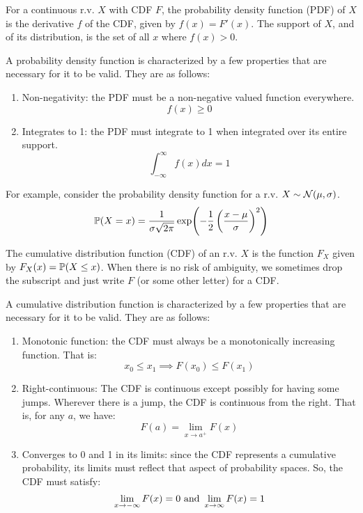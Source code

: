 \begin{definition}
For a continuous r.v. $X$ with CDF $F$, the probability density function (PDF) of $X$ is the derivative $f$ of the CDF, given by $f(x) = F'(x)$. The support of $X$, and of its distribution, is the set of all $x$ where $f(x) > 0$.
\end{definition}

\begin{theorem}
A probability density function is characterized by a few properties that are necessary for it to be valid. They are as follows:
  \begin{enumerate}
    \item Non-negativity: the PDF must be a non-negative valued function everywhere.
      $$ f(x) \geq 0  $$
    \item Integrates to 1: the PDF must integrate to 1 when integrated over its entire support.
    $$ \int_{-\infty}^{\infty} f(x) dx = 1 $$
    \end{enumerate}
\end{theorem}

\begin{example}
For example, consider the probability density function for a r.v. $X \sim \Normal(\mu, \sigma)$.
$$\P(X = x) = \frac{1}{\sigma \sqrt{2 \pi}} \exp (-\frac{1}{2} \left(\frac{x - \mu}{\sigma}\right)^2 )$$
\end{example}


\begin{definition}
The cumulative distribution function (CDF) of an r.v. $X$ is the function $F_X$ given by $F_X(x) = \P (X \leq x)$. When there is no risk of ambiguity, we sometimes drop the subscript and just write $F$ (or some other letter) for a CDF.
\end{definition}

\begin{theorem}
A cumulative distribution function is characterized by a few properties that are necessary for it to be valid. They are as follows:
  \begin{enumerate}
    \item Monotonic function: the CDF must always be a monotonically increasing function. That is:
      $$ x_0 \leq x_1 \implies F(x_0) \leq F(x_1) $$
    \item Right-continuous: The CDF is continuous except possibly for having some jumps. Wherever there is a jump, the CDF is continuous from the right. That is, for any $a$, we have:
    $$ F(a) = \lim_{x \to a^+} F(x) $$
    \item Converges to 0 and 1 in its limits: since the CDF represents a cumulative probability, its limits must reflect that aspect of probability spaces. So, the CDF must satisfy:
    $$ \lim_{x \to -\infty} F(x) = 0 \and \lim_{x \to \infty} F(x) = 1 $$
  \end{enumerate}
\end{theorem}

